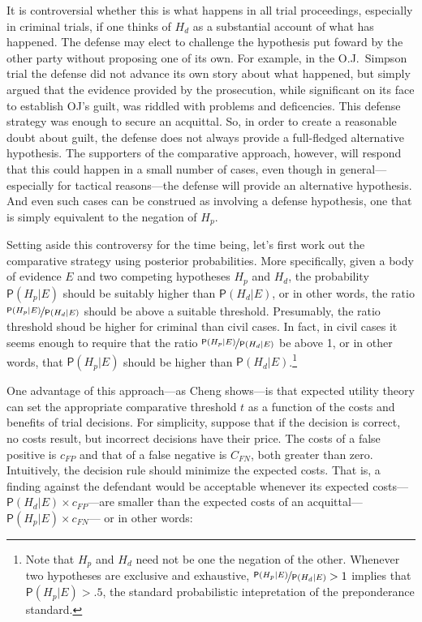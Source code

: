 \documentclass[
  10pt,
  dvipsnames,enabledeprecatedfontcommands]{scrartcl}
\newcommand{\pr}[1]{\mathsf{P}(#1)}
\begin{document}
It is controversial whether this is what happens in all trial
proceedings, especially in criminal trials, if one thinks of \(H_d\) as
a substantial account of what has happened. The defense may elect to
challenge the hypothesis put foward by the other party without proposing
one of its own. For example, in the O.J.~Simpson trial the defense did
not advance its own story about what happened, but simply argued that
the evidence provided by the prosecution, while significant on its face
to establish OJ's guilt, was riddled with problems and deficencies. This
defense strategy was enough to secure an acquittal. So, in order to
create a reasonable doubt about guilt, the defense does not always
provide a full-fledged alternative hypothesis. The supporters of the
comparative approach, however, will respond that this could happen in a
small number of cases, even though in general---especially for tactical
reasons---the defense will provide an alternative hypothesis. And even
such cases can be construed as involving a defense hypothesis, one that
is simply equivalent to the negation of \(H_p\).

Setting aside this controversy for the time being, let's first work out
the comparative strategy using posterior probabilities. More
specifically, given a body of evidence \(E\) and two competing
hypotheses \(H_p\) and \(H_d\), the probability \(\pr{H_p \vert E}\)
should be suitably higher than \(\pr{H_d \vert E}\), or in other words,
the ratio \(\nicefrac{\pr{H_p \vert E}}{\pr{H_d \vert E}}\) should be
above a suitable threshold. Presumably, the ratio threshold shoud be
higher for criminal than civil cases. In fact, in civil cases it seems
enough to require that the ratio
\(\nicefrac{\pr{H_p \vert E}}{\pr{H_d \vert E}}\) be above 1, or in
other words, that \(\pr{H_p \vert E}\) should be higher than
\(\pr{H_d \vert E}\).\footnote{Note that $H_p$ and $H_d$ need not be one the negation of the other. 
Whenever two hypotheses are exclusive and exhaustive, $\nicefrac{\pr{H_p \vert E}}{\pr{H_d \vert E}}>1$ 
implies that $\pr{H_p \vert E}>.5$, the standard probabilistic intepretation of the preponderance standard.}

One advantage of this approach---as Cheng shows---is that expected
utility theory can set the appropriate comparative threshold \(t\) as a
function of the costs and benefits of trial decisions. For simplicity,
suppose that if the decision is correct, no costs result, but incorrect
decisions have their price.  The costs of a false positive is
\(c_{FP}\) and that of a false negative is \(C_{FN}\), both greater than
zero. Intuitively, the decision rule should minimize the expected costs.
That is, a finding against the defendant would be acceptable whenever
its expected costs---\(\pr{H_d \vert E} \times c_{FP}\)---are smaller
than the expected costs of an
acquittal---\(\pr{H_p \vert E}\times c_{FN}\)--- or in other words:
\end{document}

